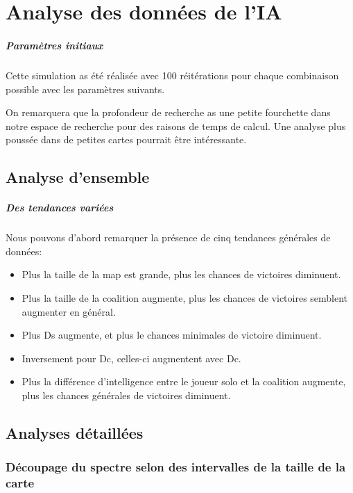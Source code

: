 \chapter{Analyse des données de l'IA}

\paragraph{Paramètres initiaux}
Cette simulation as été réalisée avec 100 réitérations pour chaque combinaison possible avec les paramètres suivants.

\begin{info}
	On remarquera que la profondeur de recherche as une petite fourchette dans notre espace de recherche pour des raisons de temps de calcul. Une analyse plus poussée dans de petites cartes pourrait être intéressante.
\end{info}

\section{Analyse d'ensemble}
\paragraph{Des tendances variées}
Nous pouvons d'abord remarquer la présence de cinq tendances générales de données:
\begin{itemize}
	\item Plus la taille de la map est grande, plus les chances de victoires diminuent.
	\item Plus la taille de la coalition augmente, plus les chances de victoires semblent augmenter en général.
	\item Plus Ds augmente, et plus le chances minimales de victoire diminuent.
	\item Inversement pour Dc, celles-ci augmentent avec Dc.
	\item Plus la différence d'intelligence entre le joueur solo et la coalition augmente, plus les chances générales de victoires diminuent.
\end{itemize}



\section{Analyses détaillées}


\subsection{Découpage du spectre selon des intervalles de la taille de la carte}
